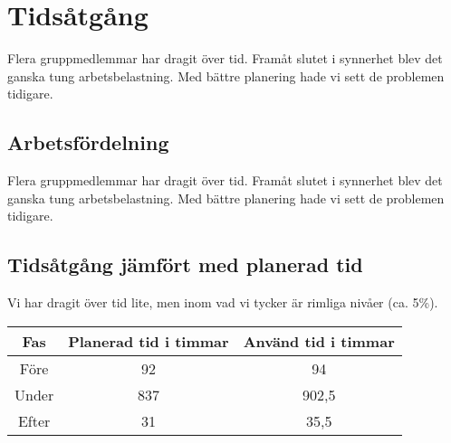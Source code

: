 \documentclass[a4paper,11pt]{article}
\begin{document}
\pagestyle{intro}
\LIPStitelsida
\clearpage
\begin{LIPSprojektidentitet}
\end{LIPSprojektidentitet}

\clearpage
\setcounter{page}{1}
\pagestyle{content}

\section{Tidsåtgång}
Flera gruppmedlemmar har dragit över tid. Framåt slutet i synnerhet blev det ganska tung arbetsbelastning. Med bättre planering hade vi sett de problemen tidigare.

\subsection{Arbetsfördelning}
Flera gruppmedlemmar har dragit över tid. Framåt slutet i synnerhet blev det ganska tung arbetsbelastning. Med bättre planering hade vi sett de problemen tidigare.

\subsection{Tidsåtgång jämfört med planerad tid}
Vi har dragit över tid lite, men inom vad vi tycker är rimliga nivåer (ca. 5\%).

\begin{tabular}{|c|c|c|}
\hline 
\textbf{Fas} & \textbf{Planerad tid i timmar} & \textbf{Använd tid i timmar} \\ 
\hline 
Före & 92 & 94 \\ 
\hline 
Under & 837 & 902,5 \\ 
\hline 
Efter & 31 & 35,5 \\ 
\hline 
\end{tabular} 
\end{document}
